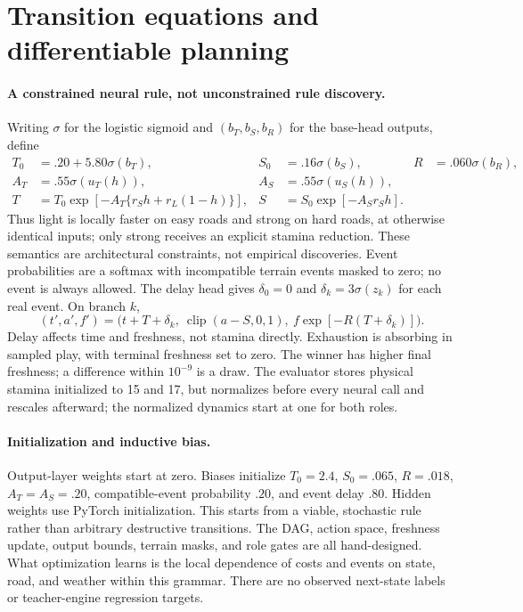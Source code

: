 \section{Transition equations and differentiable planning}
\label{app:planning}

\paragraph{A constrained neural rule, not unconstrained rule discovery.}
Writing $\sigma$ for the logistic sigmoid and $(b_T,b_S,b_R)$ for the base-head
outputs, define
\begin{align}
 T_0&=.20+5.80\sigma(b_T), & S_0&=.16\sigma(b_S), & R&=.060\sigma(b_R),\\
 A_T&=.55\sigma(u_T(h)), & A_S&=.55\sigma(u_S(h)),\\
 T&=T_0\exp[-A_T\{r_Sh+r_L(1-h)\}], &
 S&=S_0\exp[-A_Sr_Sh].
\end{align}
Thus light is locally faster on easy roads and strong on hard roads, at otherwise
identical inputs; only strong receives an explicit stamina reduction. These
semantics are architectural constraints, not empirical discoveries. Event
probabilities are a softmax with incompatible terrain events masked to zero;
no event is always allowed. The delay head gives
$\delta_0=0$ and $\delta_k=3\sigma(z_k)$ for each real event. On branch $k$,
\begin{equation}
 (t',a',f')=\bigl(t+T+\delta_k,\ \operatorname{clip}(a-S,0,1),\
 f\exp[-R(T+\delta_k)]\bigr).
\end{equation}
Delay affects time and freshness, not stamina directly. Exhaustion is absorbing
in sampled play, with terminal freshness set to zero. The winner has higher
final freshness; a difference within $10^{-9}$ is a draw. The evaluator stores
physical stamina initialized to 15 and 17, but normalizes before every neural
call and rescales afterward; the normalized dynamics start at one for both roles.

\paragraph{Initialization and inductive bias.}
Output-layer weights start at zero. Biases initialize $T_0=2.4$, $S_0=.065$,
$R=.018$, $A_T=A_S=.20$, compatible-event probability $.20$, and event delay
$.80$. Hidden weights use PyTorch initialization. This starts from a viable,
stochastic rule rather than arbitrary destructive transitions. The DAG, action
space, freshness update, output bounds, terrain masks, and role gates are all
hand-designed. What optimization learns is the local dependence of costs and
events on state, road, and weather within this grammar. There are no observed
next-state labels or teacher-engine regression targets.

